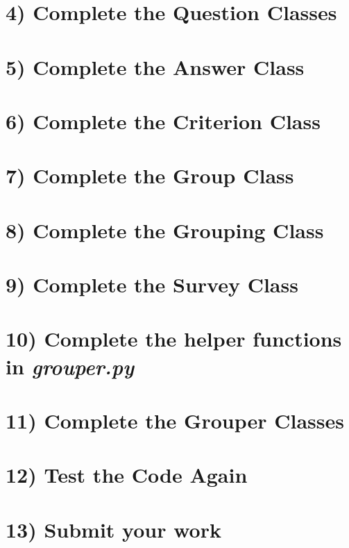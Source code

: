 \documentclass[12pt]{article}
\begin{document}
\section*{4) Complete the Question Classes}

\section*{5) Complete the Answer Class}

\section*{6) Complete the Criterion Class}

\section*{7) Complete the Group Class}

\section*{8) Complete the Grouping Class}

\section*{9) Complete the Survey Class}

\section*{10) Complete the helper functions in \textit{grouper.py}}

\section*{11) Complete the Grouper Classes}

\section*{12) Test the Code Again}

\section*{13) Submit your work}
\end{document}

